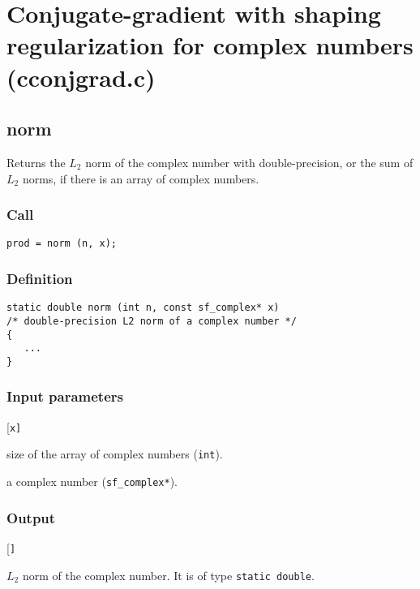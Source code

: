 \section{Conjugate-gradient with shaping regularization for complex numbers (cconjgrad.c)}




\subsection{{norm}}
Returns the $L_2$ norm of the complex number with double-precision, or the sum of $L_2$ norms, if there is an array of complex numbers.

\subsubsection*{Call}
\begin{verbatim}prod = norm (n, x);\end{verbatim}

\subsubsection*{Definition}
\begin{verbatim}
static double norm (int n, const sf_complex* x) 
/* double-precision L2 norm of a complex number */
{
   ...
}
\end{verbatim}

\subsubsection*{Input parameters}
\begin{desclist}{\tt }{\quad}[\tt x]
   \setlength\itemsep{0pt}
   \item[n] size of the array of complex numbers (\texttt{int}).  
   \item[x] a complex number (\texttt{sf\_complex*}).  
\end{desclist}

\subsubsection*{Output}
\begin{desclist}{\tt }{\quad}[\tt ]
   \setlength\itemsep{0pt}  
   \item[prod] $L_2$ norm of the complex number. It is of type \texttt{static double}.
\end{desclist}





